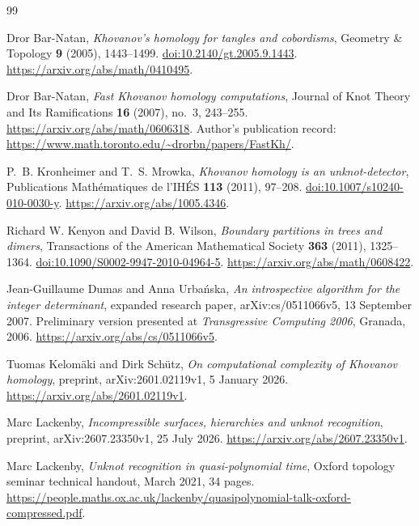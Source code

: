 \begin{thebibliography}{99}

Dror Bar-Natan,
\emph{Khovanov's homology for tangles and cobordisms},
Geometry \& Topology \textbf{9} (2005), 1443--1499.
\href{https://doi.org/10.2140/gt.2005.9.1443}{doi:10.2140/gt.2005.9.1443}.
\url{https://arxiv.org/abs/math/0410495}.

Dror Bar-Natan,
\emph{Fast Khovanov homology computations},
Journal of Knot Theory and Its Ramifications \textbf{16} (2007), no.~3,
243--255.
\url{https://arxiv.org/abs/math/0606318}.
Author's publication record:
\url{https://www.math.toronto.edu/~drorbn/papers/FastKh/}.

P.~B. Kronheimer and T.~S. Mrowka,
\emph{Khovanov homology is an unknot-detector},
Publications Math\'ematiques de l'IH\'ES \textbf{113} (2011), 97--208.
\href{https://doi.org/10.1007/s10240-010-0030-y}{doi:10.1007/s10240-010-0030-y}.
\url{https://arxiv.org/abs/1005.4346}.

Richard W. Kenyon and David B. Wilson,
\emph{Boundary partitions in trees and dimers},
Transactions of the American Mathematical Society \textbf{363} (2011),
1325--1364.
\href{https://doi.org/10.1090/S0002-9947-2010-04964-5}{doi:10.1090/S0002-9947-2010-04964-5}.
\url{https://arxiv.org/abs/math/0608422}.

Jean-Guillaume Dumas and Anna Urba\'nska,
\emph{An introspective algorithm for the integer determinant},
expanded research paper, arXiv:cs/0511066v5, 13 September 2007.
Preliminary version presented at \emph{Transgressive Computing 2006},
Granada, 2006.
\url{https://arxiv.org/abs/cs/0511066v5}.

Tuomas Kelom\"aki and Dirk Sch\"utz,
\emph{On computational complexity of Khovanov homology},
preprint, arXiv:2601.02119v1, 5 January 2026.
\url{https://arxiv.org/abs/2601.02119v1}.

Marc Lackenby,
\emph{Incompressible surfaces, hierarchies and unknot recognition},
preprint, arXiv:2607.23350v1, 25 July 2026.
\url{https://arxiv.org/abs/2607.23350v1}.

Marc Lackenby,
\emph{Unknot recognition in quasi-polynomial time},
Oxford topology seminar technical handout, March 2021, 34 pages.
\url{https://people.maths.ox.ac.uk/lackenby/quasipolynomial-talk-oxford-compressed.pdf}.


\end{thebibliography}
